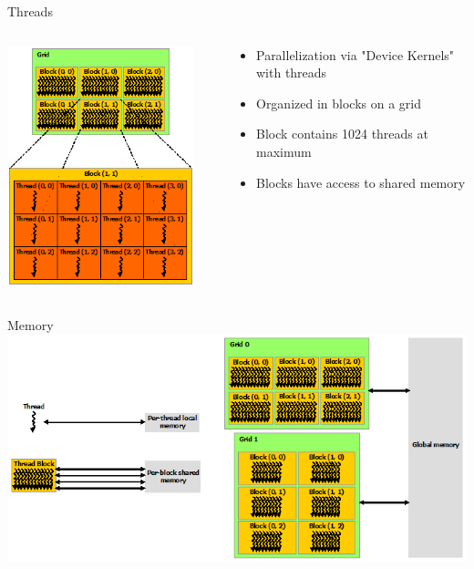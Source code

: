\documentclass{beamer}
\begin{document}
\begin{frame}{Threads}
	\begin{columns}
		\begin{column}{0.45\textwidth}
			\centering \includegraphics[width=0.9\textwidth]{cuda_threads.png}
		\end{column}
		\begin{column}{0.55\textwidth}
			\begin{itemize}
				\item Parallelization via "Device Kernels" with threads
				\item Organized in blocks on a grid
				\item Block contains 1024 threads at maximum
				\item Blocks have access to shared memory
			\end{itemize}
		\end{column}
	\end{columns}
\end{frame}

\begin{frame}{Memory}
	\includegraphics[width=1.0\textwidth]{cuda_memory.png}
\end{frame}
\end{document}
